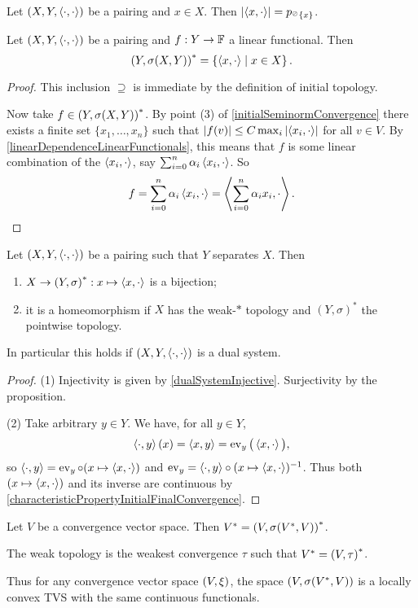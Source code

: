 \begin{lemma}
Let $(X,Y,\left\langle \cdot,\cdot \right\rangle)$ be a pairing and $x\in X$. Then $\left|\left\langle x,\cdot \right\rangle\right| = p_{^\oslash\{x\}}$.
\end{lemma}

\begin{proposition} \label{functionalContinuityWeakTopology}
Let $\left( X,Y,\left\langle \cdot,\cdot \right\rangle \right)$ be a pairing and $f: Y\to \mathbb{F}$ a linear functional. Then
\[ {(Y,\sigma(X,Y))}^* = \left\{ \left\langle x,\cdot \right\rangle \;\middle|\; x\in X \right\}. \]
\end{proposition}
\begin{proof}
This inclusion $\supseteq$ is immediate by the definition of initial topology.

Now take $f\in {(Y,\sigma(X,Y))}^*$. By point (3) of \ref{initialSeminormConvergence} there exists a finite set $\{x_1, \ldots, x_n\}$ such that $|f(v)| \leq C\max_{i}\left|\left\langle x_i, \cdot \right\rangle\right|$ for all $v\in V$. By \ref{linearDependenceLinearFunctionals}, this means that $f$ is some linear combination of the $\left\langle x_i,\cdot \right\rangle$, say $\sum_{i=0}^n \alpha_i \left\langle x_i, \cdot \right\rangle$. So
\[ f = \sum_{i=0}^n \alpha_i \left\langle x_i, \cdot \right\rangle = \left\langle \sum_{i=0}^n \alpha_i x_i, \cdot \right\rangle. \]
\end{proof}
\begin{corollary} \label{dualSystemBijection}
Let $\left( X,Y,\left\langle \cdot,\cdot \right\rangle \right)$ be a pairing such that $Y$ separates $X$. Then
\begin{enumerate}
\item $X\to \left( Y, \sigma \right)^*: x\mapsto \left\langle x,\cdot \right\rangle$ is a bijection;
\item it is a homeomorphism if $X$ has the weak-$*$ topology and $(Y,\sigma)^*$ the pointwise topology.
\end{enumerate} 
\end{corollary}
In particular this holds if $\left( X,Y,\left\langle \cdot,\cdot \right\rangle \right)$ is a dual system.
\begin{proof}
(1) Injectivity is given by \ref{dualSystemInjective}. Surjectivity by the proposition.

(2) Take arbitrary $y\in Y$. We have, for all $y\in Y$,
\[ \left\langle \cdot, y \right\rangle(x) = \left\langle x,y \right\rangle = \operatorname{ev}_y\big(\left\langle x, \cdot \right\rangle\big), \]
so $\left\langle \cdot, y \right\rangle = \operatorname{ev}_y \circ (x\mapsto \left\langle x,\cdot \right\rangle)$ and $\operatorname{ev}_y = \left\langle \cdot, y \right\rangle \circ (x\mapsto \left\langle x,\cdot \right\rangle)^{-1}$. Thus both $(x\mapsto \left\langle x,\cdot \right\rangle)$ and its inverse are continuous by \ref{characteristicPropertyInitialFinalConvergence}.
\end{proof}
\begin{corollary}
Let $V$ be a convergence vector space. Then $V^* = \left( V, \sigma(V^*, V) \right)^*$.

The weak topology is the weakest convergence $\tau$ such that $V^* = \left( V, \tau \right)^*$.
\end{corollary}
Thus for any convergence vector space $\left( V,\xi \right)$, the space $\left( V, \sigma(V^*, V) \right)$ is a locally convex TVS with the same continuous functionals.

